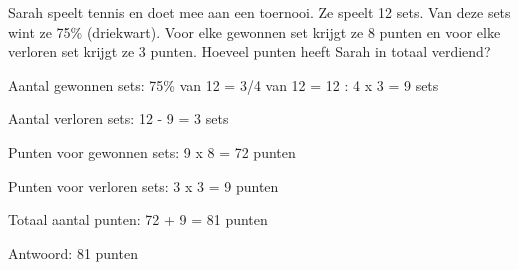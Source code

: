 \begin{opgave}
Sarah speelt tennis en doet mee aan een toernooi. Ze speelt 12 sets. Van deze 
sets wint ze 75\% (driekwart). Voor elke gewonnen set krijgt ze 8 punten en 
voor elke verloren set krijgt ze 3 punten. Hoeveel punten heeft Sarah in 
totaal verdiend?
\end{opgave}

\begin{oplossing}
Aantal gewonnen sets:
75\% van 12 = 3/4 van 12 = 12 : 4 x 3 = 9 sets

Aantal verloren sets:
12 - 9 = 3 sets

Punten voor gewonnen sets:
9 x 8 = 72 punten

Punten voor verloren sets:
3 x 3 = 9 punten

Totaal aantal punten:
72 + 9 = 81 punten

Antwoord: 81 punten
\end{oplossing}